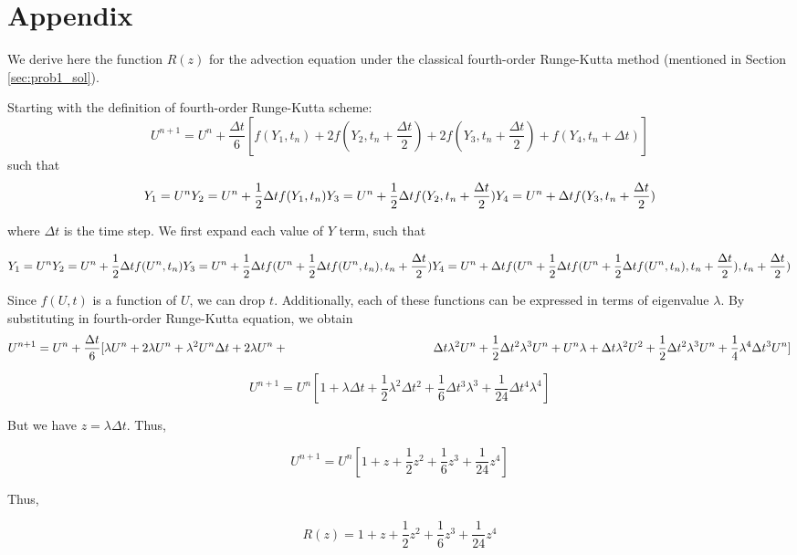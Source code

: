 \section*{Appendix}
We derive here the function $R(z)$ for the advection equation under the classical fourth-order Runge-Kutta method (mentioned in Section \ref{sec:prob1_sol}).

Starting with the definition of fourth-order Runge-Kutta scheme: 
$$
U^{n+1} = U^{n} + \frac{\Delta t}{6}[f(Y_{1},t_{n})+2f(Y_{2},t_{n}+\frac{\Delta t}{2})+2f(Y_{3},t_{n}+\frac{\Delta t}{2})+f(Y_{4},t_{n}+\Delta t)]
$$
such that 
$$
Y_{1}=U^{n}
\\
Y_{2}=U^{n}+\frac{1}{2}\Delta t f(Y_{1},t_{n})
\\
Y_{3}=U^{n}+\frac{1}{2}\Delta t f(Y_{2},t_{n}+\frac{\Delta t}{2})
\\
Y_{4}=U^{n}+\Delta t f(Y_{3},t_{n}+\frac{\Delta t}{2})
$$

where $\Delta t$ is the time step. We first expand each value of $Y$ term, such that 

$$
Y_{1}=U^{n}
\\
Y_{2}=U^{n}+\frac{1}{2}\Delta t f(U^{n},t_{n})
\\
Y_{3}=U^{n}+\frac{1}{2}\Delta t f(U^{n}+\frac{1}{2}\Delta t f(U^{n},t_{n}),t_{n}+\frac{\Delta t}{2})
\\
Y_{4}=U^{n}+\Delta t f(U^{n}+\frac{1}{2}\Delta t f(U^{n}+\frac{1}{2}\Delta t f(U^{n},t_{n}),t_{n}+\frac{\Delta t}{2}),t_{n}+\frac{\Delta t}{2})
$$

Since $f(U,t)$ is a function of $U$, we can drop $t$. Additionally, each of these functions can be expressed in terms of eigenvalue $\lambda$. By substituting in fourth-order Runge-Kutta equation, we obtain 
$$
U^{n+1} = U^{n} + \frac{\Delta t}{6}[\lambda U^{n}+ 2\lambda U^{n} + \lambda^{2}U^{n}\Delta t + 2 \lambda U^{n} + 
\\ \quad \quad \quad \quad \quad \quad \quad \quad \quad \quad \quad \quad \Delta t \lambda^{2}U^{n} + \frac{1}{2}\Delta t^{2}\lambda^{3}U^{n} +U^{n}\lambda + \Delta t\lambda^{2}U^{2} + \frac{1}{2}\Delta t^{2}\lambda^{3}U^{n} + \frac{1}{4}\lambda^{4}\Delta t^{3}U^{n} ]
$$

$$
U^{n+1} = U^{n}[1+\lambda \Delta t + \frac{1}{2} \lambda^{2}\Delta t^{2} + \frac{1}{6} \Delta t^{3}\lambda^{3}+\frac{1}{24} \Delta t^{4}\lambda^{4}]
$$

But we have $z=\lambda\Delta t$. Thus, 

$$
U^{n+1} = U^{n}[1+z + \frac{1}{2} z^{2} + \frac{1}{6} z^{3}+\frac{1}{24} z^{4}]
$$

Thus,

$$R(z)=1+z + \frac{1}{2} z^{2} + \frac{1}{6} z^{3}+\frac{1}{24} z^{4}$$